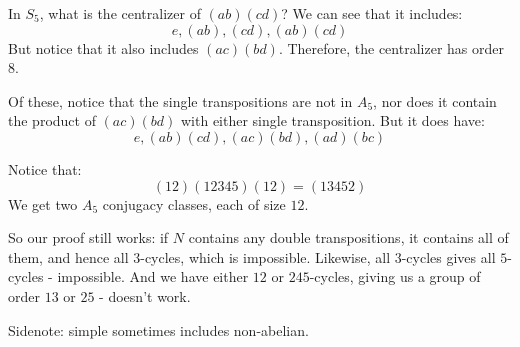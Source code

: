 In $ S_{5} $, what is the centralizer of $ (ab)(cd) $?
We can see that it includes:
\begin{equation*}
    e, (ab), (cd), (ab)(cd)
\end{equation*}
But notice that it also includes $ (ac)(bd) $.
Therefore, the centralizer has order $ 8 $.

Of these, notice that the single transpositions are not in $ A_{5} $, nor does it
contain the product of $ (ac)(bd) $ with either single transposition.
But it does have:
\begin{equation*}
    e, (ab)(cd), (ac)(bd), (ad)(bc)
\end{equation*}

Notice that:
\begin{equation*}
    (12)(12345)(12) = (13452)
\end{equation*}
We get two $ A_{5} $ conjugacy classes, each of size $ 12 $.

So our proof still works: if $ N $ contains any double transpositions, it contains all of them,
and hence all $ 3 $-cycles, which is impossible.
Likewise, all $ 3 $-cycles gives all $ 5 $-cycles - impossible.
And we have either $ 12 $ or $ 24 5 $-cycles,
giving us a group of order $ 13 $ or $ 25 $ - doesn't work.

Sidenote: simple sometimes includes non-abelian.
